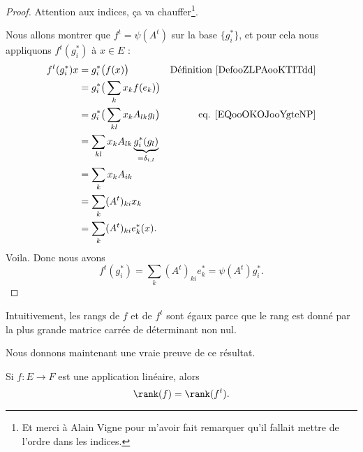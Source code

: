 \begin{proof}
	Attention aux indices, ça va chauffer\footnote{Et merci à Alain Vigne pour m'avoir fait remarquer qu'il fallait mettre de l'ordre dans les indices.}.

	Nous allons montrer que \( f^t=\psi(A^t)\) sur la base \( \{ g_i^* \}\), et pour cela nous appliquons \( f^t(g_i^*)\) à \( x\in E\) :
	\begin{subequations}
		\begin{align}
			f^t(g_i^*)x & =g_i^*\big( f(x) \big)                                     & \text{Définition  \ref{DefooZLPAooKTITdd}} \\
			            & =g_i^*\big( \sum_kx_kf(e_k) \big)                                                                       \\
			            & =g_i^*\big( \sum_{kl}x_kA_{lk}g_l \big)                    & \text{eq. \eqref{EQooOKOJooYgteNP}}        \\
			            & =\sum_{kl}x_kA_{lk}\underbrace{g_i^*(g_l)}_{=\delta_{i,l}}                                              \\
			            & =\sum_kx_kA_{ik}                                                                                        \\
			            & =\sum_k(A^t)_{ki}x_k                                                                                    \\
			            & =\sum_k(A^t)_{ki}e^*_k(x).
		\end{align}
	\end{subequations}
	Voila. Donc nous avons
	\begin{equation}
		f^t(g_i^*)=\sum_k(A^t)_{ki}e^*_k=\psi(A^t)g_i^*.
	\end{equation}
\end{proof}

\begin{normaltext}
	Intuitivement,  les rangs de \( f\) et de \( f^t\) sont égaux parce que le rang est donné par la plus grande matrice carrée de déterminant non nul.

	Nous donnons maintenant une vraie preuve de ce résultat.
\end{normaltext}

\begin{lemma}   \label{LemSEpTcW}
	Si \( f\colon E\to F\) est une application linéaire, alors
	\begin{equation}
		\rank(f)=\rank(f^t).
	\end{equation}
\end{lemma}


